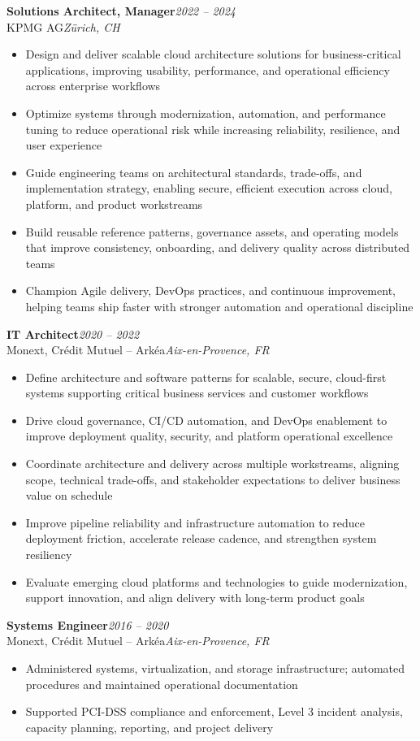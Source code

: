 \documentclass[10pt,a4paper]{article}
\newcommand{\jobseparator}{\vspace{0.45em}}
\newcommand{\job}[6]{%
  {\textbf{#1}}\hfill{\textit{#2}}\\
  {#3}\hfill{\textit{#4}}\\
  \begin{itemize}
    #5
  \end{itemize}
}
\begin{document}
\job{Solutions Architect, Manager}{2022 -- 2024}{KPMG AG}{Zürich, CH}{
  \item Design and deliver scalable cloud architecture solutions for business-critical applications, improving usability, performance, and operational efficiency across enterprise workflows
  \item Optimize systems through modernization, automation, and performance tuning to reduce operational risk while increasing reliability, resilience, and user experience
  \item Guide engineering teams on architectural standards, trade-offs, and implementation strategy, enabling secure, efficient execution across cloud, platform, and product workstreams
  \item Build reusable reference patterns, governance assets, and operating models that improve consistency, onboarding, and delivery quality across distributed teams
  \item Champion Agile delivery, DevOps practices, and continuous improvement, helping teams ship faster with stronger automation and operational discipline
}{ }
\jobseparator

\job{IT Architect}{2020 -- 2022}{Monext, Crédit Mutuel -- Arkéa}{Aix-en-Provence, FR}{
  \item Define architecture and software patterns for scalable, secure, cloud-first systems supporting critical business services and customer workflows
  \item Drive cloud governance, CI/CD automation, and DevOps enablement to improve deployment quality, security, and platform operational excellence
  \item Coordinate architecture and delivery across multiple workstreams, aligning scope, technical trade-offs, and stakeholder expectations to deliver business value on schedule
  \item Improve pipeline reliability and infrastructure automation to reduce deployment friction, accelerate release cadence, and strengthen system resiliency
  \item Evaluate emerging cloud platforms and technologies to guide modernization, support innovation, and align delivery with long-term product goals
}{ }
\jobseparator

\job{Systems Engineer}{2016 -- 2020}{Monext, Crédit Mutuel -- Arkéa}{Aix-en-Provence, FR}{
  \item Administered systems, virtualization, and storage infrastructure; automated procedures and maintained operational documentation
  \item Supported PCI-DSS compliance and enforcement, Level 3 incident analysis, capacity planning, reporting, and project delivery
}{ }
\jobseparator
\end{document}
